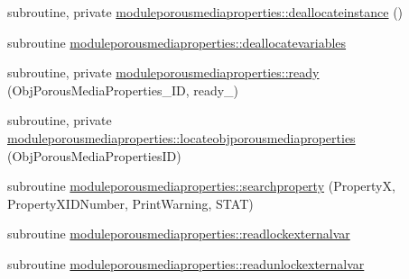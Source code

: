 \begin{DoxyCompactItemize}
subroutine, private \mbox{\hyperlink{namespacemoduleporousmediaproperties_a7002642c0fa8ff01f584386876557fef}{moduleporousmediaproperties\+::deallocateinstance}} ()
\item 
subroutine \mbox{\hyperlink{namespacemoduleporousmediaproperties_a03075fd748d4630c43019d9d8b5c9b79}{moduleporousmediaproperties\+::deallocatevariables}}
\item 
subroutine, private \mbox{\hyperlink{namespacemoduleporousmediaproperties_a1a2026bd74e611727f9dca5173548d05}{moduleporousmediaproperties\+::ready}} (Obj\+Porous\+Media\+Properties\+\_\+\+ID, ready\+\_\+)
\item 
subroutine, private \mbox{\hyperlink{namespacemoduleporousmediaproperties_a69bcc7ae1a4b78b640c2d9f0d660587f}{moduleporousmediaproperties\+::locateobjporousmediaproperties}} (Obj\+Porous\+Media\+Properties\+ID)
\item 
subroutine \mbox{\hyperlink{namespacemoduleporousmediaproperties_af651cef8320f1769d6f02a15144aae88}{moduleporousmediaproperties\+::searchproperty}} (PropertyX, Property\+X\+I\+D\+Number, Print\+Warning, S\+T\+AT)
\item 
subroutine \mbox{\hyperlink{namespacemoduleporousmediaproperties_a56260cc89bfdab790c373015aa5f4675}{moduleporousmediaproperties\+::readlockexternalvar}}
\item 
subroutine \mbox{\hyperlink{namespacemoduleporousmediaproperties_aa21cfad85460a30a39a9fb8f3421f874}{moduleporousmediaproperties\+::readunlockexternalvar}}
\end{DoxyCompactItemize}
